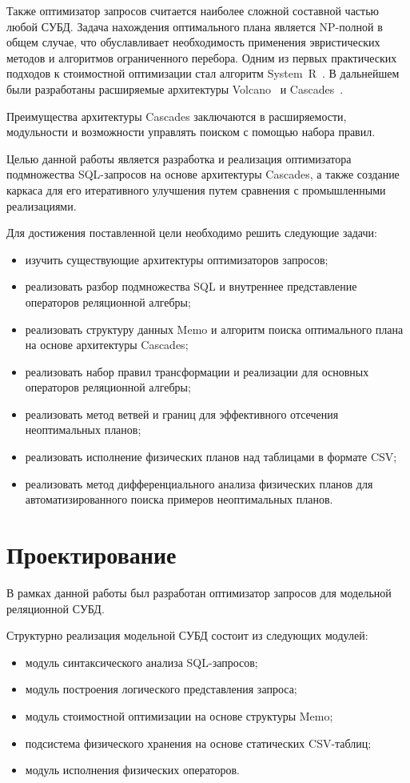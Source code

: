 \documentclass[fontsize=14pt, russian]{scrartcl}
\begin{document}
Также оптимизатор запросов считается наиболее сложной составной частью любой
СУБД. Задача нахождения оптимального плана является NP-полной в общем случае,
что обуславливает необходимость применения эвристических методов и алгоритмов
ограниченного перебора. Одним из первых практических подходов к стоимостной
оптимизации стал алгоритм System~R~\cite{Selinger1979}. В дальнейшем были
разработаны расширяемые архитектуры Volcano~\cite{GraefeMcKenna1993} и
Cascades~\cite{Graefe1995}.

Преимущества архитектуры Cascades заключаются в расширяемости, модульности и
возможности управлять поиском с помощью набора правил.

Целью данной работы является разработка и реализация оптимизатора подмножества
SQL-запросов на основе архитектуры Cascades, а также создание каркаса для его
итеративного улучшения путем сравнения с промышленными реализациями.

Для достижения поставленной цели необходимо решить следующие задачи:
\begin{itemize}
  \item изучить существующие архитектуры оптимизаторов запросов;
  \item реализовать разбор подмножества SQL и внутреннее представление
        операторов реляционной алгебры;
  \item реализовать структуру данных Memo и алгоритм поиска оптимального плана
        на основе архитектуры Cascades;
  \item реализовать набор правил трансформации и реализации для основных
        операторов реляционной алгебры;
  \item реализовать метод ветвей и границ для эффективного отсечения
        неоптимальных планов;
  \item реализовать исполнение физических планов над таблицами в формате CSV;
  \item реализовать метод дифференциального анализа физических планов для
        автоматизированного поиска примеров неоптимальных планов.
\end{itemize}

\section{Проектирование}

В рамках данной работы был разработан оптимизатор запросов для модельной
реляционной СУБД.

Структурно реализация модельной СУБД состоит из следующих модулей:
\begin{itemize}
  \item модуль синтаксического анализа SQL-запросов;
  \item модуль построения логического представления запроса;
  \item модуль стоимостной оптимизации на основе структуры Memo;
  \item подсистема физического хранения на основе статических CSV-таблиц;
  \item модуль исполнения физических операторов.
\end{itemize}
\end{document}
